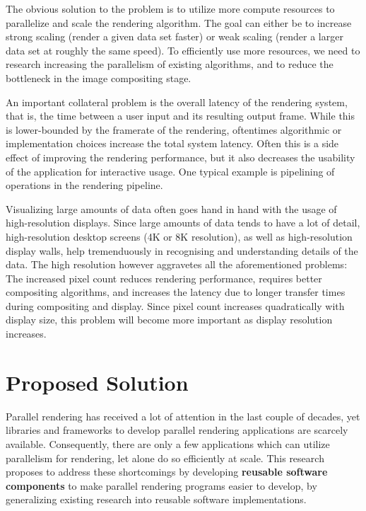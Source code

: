  The obvious solution to the problem is to utilize more compute resources to
 parallelize and scale the rendering algorithm. The goal can either be to
 increase strong scaling (render a given data set faster) or weak scaling (render
 a larger data set at roughly the same speed). To efficiently use more resources,
 we need to research increasing the parallelism of existing algorithms, and to
 reduce the bottleneck in the image compositing stage.

 An important collateral problem is the overall latency of the rendering system,
 that is, the time between a user input and its resulting output frame. While
 this is lower-bounded by the framerate of the rendering, oftentimes algorithmic
 or implementation choices increase the total system latency. Often this is a
 side effect of improving the rendering performance, but it also decreases the
 usability of the application for interactive usage. One typical example is
 pipelining of operations in the rendering pipeline.

 Visualizing large amounts of data often goes hand in hand with the usage of
 high-resolution displays. Since large amounts of data tends to have a lot of
 detail, high-resolution desktop screens (4K or 8K resolution), as well as
 high-resolution display walls, help tremenduously in recognising and
 understanding details of the data. The high resolution however aggravetes all
 the aforementioned problems: The increased pixel count reduces rendering
 performance, requires better compositing algorithms, and increases the latency
 due to longer transfer times during compositing and display. Since pixel count
 increases quadratically with display size, this problem will become more
 important as display resolution increases.

 \chapter{Proposed Solution} %

 Parallel rendering has received a lot of attention in the last couple of
 decades, yet libraries and frameworks to develop parallel rendering applications
 are scarcely available. Consequently, there are only a few applications which
 can utilize parallelism for rendering, let alone do so efficiently at scale.
 This research proposes to address these shortcomings by developing {\bf reusable
   software components} to make parallel rendering programs easier to develop, by
 generalizing existing research into reusable software implementations.

